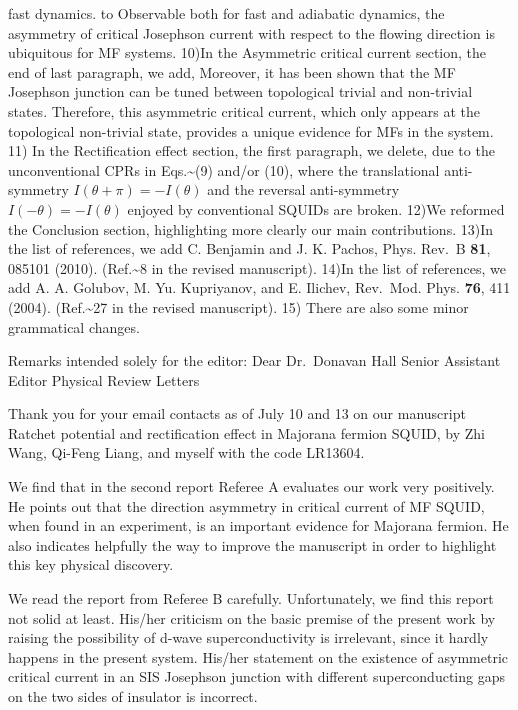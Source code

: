 \documentclass[11pt]{article}
\begin{document}
fast dynamics. to Observable both for fast and adiabatic dynamics, the
asymmetry of critical Josephson current with respect to the flowing
direction is ubiquitous for MF systems. 10)In the Asymmetric critical
current section, the end of last paragraph, we add, Moreover, it has
been shown that the MF Josephson junction can be tuned between
topological trivial and non-trivial states. Therefore, this asymmetric
critical current, which only appears at the topological non-trivial
state, provides a unique evidence for MFs in the system. 11) In the
Rectification effect section, the first paragraph, we delete, due to the
unconventional CPRs in Eqs.\textasciitilde{}(9) and/or (10), where the
translational anti-symmetry \(I(\theta+\pi)=-I(\theta)\) and the
reversal anti-symmetry \(I(-\theta)=-I(\theta)\) enjoyed by conventional
SQUIDs are broken\cite{quintero}. 12)We reformed the Conclusion section,
highlighting more clearly our main contributions. 13)In the list of
references, we add C. Benjamin and J. K. Pachos, Phys. Rev.~B
\textbf{81}, 085101 (2010). (Ref.\textasciitilde{}8 in the revised
manuscript). 14)In the list of references, we add A. A. Golubov, M. Yu.
Kupriyanov, and E. Ilichev, Rev.~Mod. Phys. \textbf{76}, 411 (2004).
(Ref.\textasciitilde{}27 in the revised manuscript). 15) There are also
some minor grammatical changes.

Remarks intended solely for the editor: Dear Dr.~Donavan Hall Senior
Assistant Editor Physical Review Letters

Thank you for your email contacts as of July 10 and 13 on our manuscript
Ratchet potential and rectification effect in Majorana fermion SQUID, by
Zhi Wang, Qi-Feng Liang, and myself with the code LR13604.

We find that in the second report Referee A evaluates our work very
positively. He points out that the direction asymmetry in critical
current of MF SQUID, when found in an experiment, is an important
evidence for Majorana fermion. He also indicates helpfully the way to
improve the manuscript in order to highlight this key physical
discovery.

We read the report from Referee B carefully. Unfortunately, we find this
report not solid at least. His/her criticism on the basic premise of the
present work by raising the possibility of d-wave superconductivity is
irrelevant, since it hardly happens in the present system. His/her
statement on the existence of asymmetric critical current in an SIS
Josephson junction with different superconducting gaps on the two sides
of insulator is incorrect.
\end{document}
